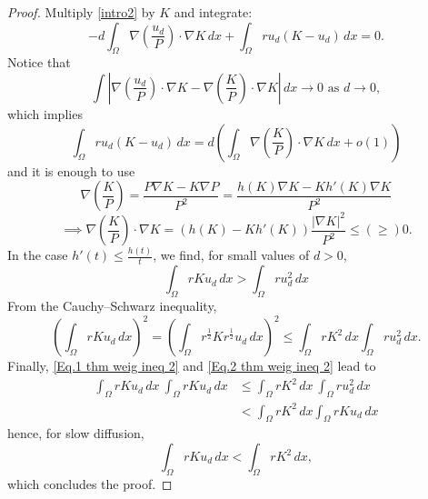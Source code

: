\documentclass[11pt]{article}
\newcommand{\parentheses}[1]{\left(#1\right)}
\newcommand{\module}[1]{\left|#1\right|}
\theoremstyle{definition}
\theoremstyle{remark}
\begin{document}
\begin{proof}
        Multiply \eqref{intro2} by $K$ and integrate:
        \begin{equation*}
            -d\int_\Omega\nabla\parentheses{\frac{u_d}{P}}\cdot\nabla K\,dx+\int_\Omega ru_d(K-u_d)\,dx=0.
        \end{equation*}
        Notice that
        \begin{equation*}
            \int\module{\nabla\parentheses{\frac{u_d}{P}}\cdot\nabla K-\nabla\parentheses{\frac{K}{P}}\cdot\nabla K}\,dx\to0 \textrm{ as } d\to0, 
        \end{equation*}
        which implies
        \begin{equation*}
            \int_\Omega ru_d(K-u_d)\,dx=d\parentheses{\int_\Omega\nabla\parentheses{\frac{K}{P}}\cdot\nabla K\,dx+o(1)}
        \end{equation*}
        and it is enough to use
        \begin{equation*}
            \nabla\parentheses{\frac{K}{P}}=\frac{P\nabla K-K\nabla P}{P^2}=\frac{h(K)\nabla K-Kh'(K)\nabla K}{P^2}
\end{equation*}
      \begin{equation*}
\implies \nabla\parentheses{\frac{K}{P}}\cdot\nabla K=(h(K)-Kh'(K))\frac{|\nabla K|^2}{P^2}\leq(\geq)0.
        \end{equation*}
In the case $h'(t)\leq\frac{h(t)}{t}$, we find, for small values of $d>0$,
\begin{equation}\label{Eq.1 thm weig ineq 2}
    \int_\Omega rKu_d\,dx>\int_\Omega ru_d^2\,dx
\end{equation}
From the Cauchy–Schwarz inequality, 
\begin{equation}\label{Eq.2 thm weig ineq 2}
    \parentheses{\int_\Omega rKu_d\,dx}^2=\parentheses{\int_\Omega r^\frac{1}{2}Kr^\frac{1}{2}u_d\,dx}^2\leq\int_\Omega rK^2\,dx\int_\Omega ru_d^2\,dx.
\end{equation}
Finally, \eqref{Eq.1 thm weig ineq 2} and \eqref{Eq.2 thm weig ineq 2} lead to
\begin{align*}
\int_\Omega rK u_d\,dx ~\int_\Omega r K u_d\,dx  & \leq\int_\Omega rK^2\,dx ~\int_\Omega ru_d^2\,dx 
\\
&  <  \int_\Omega rK^2\,dx   \int_\Omega rKu_d\,dx  
\end{align*}
hence, for slow diffusion,
\begin{equation*}
\int_\Omega r K u_d\,dx   %
<  \int_\Omega rK^2\,dx,
\end{equation*}
which concludes the proof.

\end{proof}
\end{document}

